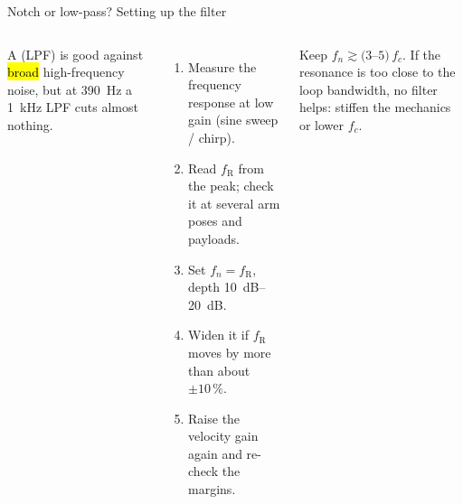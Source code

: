 \documentclass[aspectratio=169,10pt]{beamer}
\newcommand{\dat}[1]{data/#1.dat}
\begin{document}
\begin{frame}[t]{Notch or low-pass? Setting up the filter}
\begin{columns}[T,onlytextwidth]
\centering
{}
{\small A  (LPF) is good against \hl{broad} high-frequency noise, but at \SI{390}{Hz} a \SI{1}{kHz} LPF cuts almost nothing.}
\begin{enumerate}\small
\item Measure the frequency response at low gain (sine sweep / chirp).
\item Read $f_\text{R}$ from the peak; check it at several arm poses and payloads.
\item Set $f_n=f_\text{R}$, depth \SIrange{10}{20}{dB}.
\item Widen it if $f_\text{R}$ moves by more than about $\pm10\,\%$.
\item Raise the velocity gain again and re-check the margins.
\end{enumerate}
\begin{keybox}
\small Keep $f_n\gtrsim(3$--$5)\,f_c$. If the resonance is too close to the loop bandwidth, no filter helps: stiffen the mechanics or lower $f_c$.
\end{keybox}
\end{columns}
\end{frame}
\end{document}
